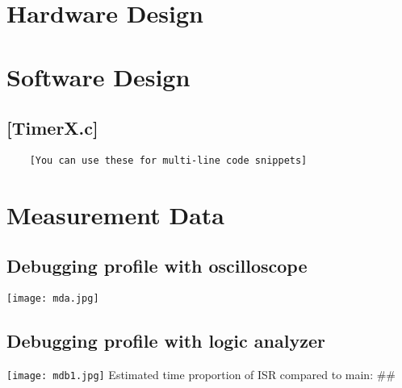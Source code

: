 \documentclass{article}
\begin{document}
\section{Hardware Design} %

\section{Software Design} %

\subsection{[TimerX.c]} %

\begin{framed}\begin{verbatim}
	[You can use these for multi-line code snippets]
\end{verbatim}\end{framed}

\section{Measurement Data}

\subsection{Debugging profile with oscilloscope}

	\texttt{[image: mda.jpg]} 

\subsection{Debugging profile with logic analyzer}

	\texttt{[image: mdb1.jpg]}
	Estimated time proportion of ISR compared to main: ## %
\end{document}
